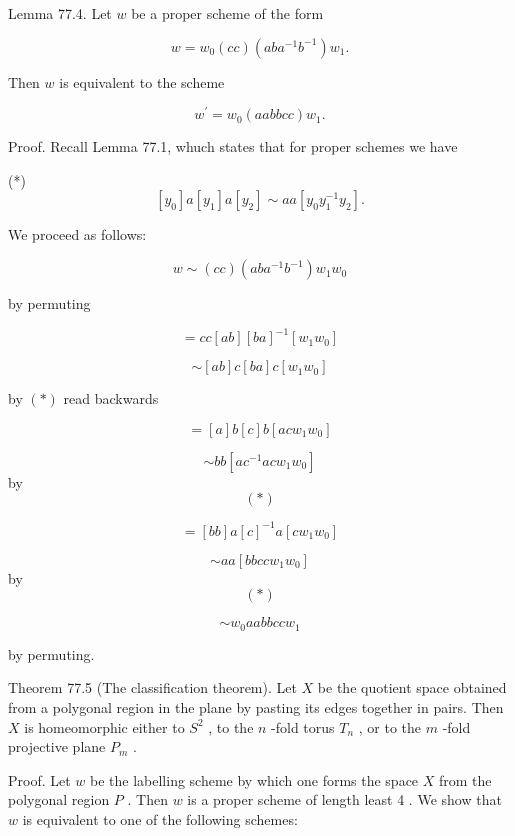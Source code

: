 \documentclass[10pt]{article}
\begin{document}
Lemma 77.4. Let \(w\) be a proper scheme of the form

\[
w = {w}_{0}\left( {cc}\right) \left( {{ab}{a}^{-1}{b}^{-1}}\right) {w}_{1}.
\]

Then \(w\) is equivalent to the scheme

\[
{w}^{\prime } = {w}_{0}\left( {aabbcc}\right) {w}_{1}.
\]

Proof. Recall Lemma 77.1, whuch states that for proper schemes we have

(*)
\[
\left\lbrack  {y}_{0}\right\rbrack  a\left\lbrack  {y}_{1}\right\rbrack  a\left\lbrack  {y}_{2}\right\rbrack   \sim  {aa}\left\lbrack  {{y}_{0}{y}_{1}^{-1}{y}_{2}}\right\rbrack  .
\]

We proceed as follows:

\[
w \sim  \left( {cc}\right) \left( {{ab}{a}^{-1}{b}^{-1}}\right) {w}_{1}{w}_{0}
\]

by permuting

\[
= {cc}\left\lbrack  {ab}\right\rbrack  {\left\lbrack  ba\right\rbrack  }^{-1}\left\lbrack  {{w}_{1}{w}_{0}}\right\rbrack
\]

\[
\sim  \left\lbrack  {ab}\right\rbrack  c\left\lbrack  {ba}\right\rbrack  c\left\lbrack  {{w}_{1}{w}_{0}}\right\rbrack
\]

by \(\left( *\right)\) read backwards

\[
= \left\lbrack  a\right\rbrack  b\left\lbrack  c\right\rbrack  b\left\lbrack  {{ac}{w}_{1}{w}_{0}}\right\rbrack
\]

\[
\sim  {bb}\left\lbrack  {a{c}^{-1}{ac}{w}_{1}{w}_{0}}\right\rbrack
\]
 by
\[
\left( *\right)
\]

\[
= \left\lbrack  {bb}\right\rbrack  a{\left\lbrack  c\right\rbrack  }^{-1}a\left\lbrack  {c{w}_{1}{w}_{0}}\right\rbrack
\]

\[
\sim  {aa}\left\lbrack  {{bbcc}{w}_{1}{w}_{0}}\right\rbrack
\]
 by
\[
\left( *\right)
\]

\[
\sim  {w}_{0}{aabbcc}{w}_{1}
\]

by permuting.

Theorem 77.5 (The classification theorem). Let \(X\) be the quotient space obtained from a polygonal region in the plane by pasting its edges together in pairs. Then \(X\) is homeomorphic either to \({S}^{2}\) , to the \(n\) -fold torus \({T}_{n}\) , or to the \(m\) -fold projective plane \({P}_{m}\) .

Proof. Let \(w\) be the labelling scheme by which one forms the space \(X\) from the polygonal region \(P\) . Then \(w\) is a proper scheme of length least 4 . We show that \(w\) is equivalent to one of the following schemes:
\end{document}
